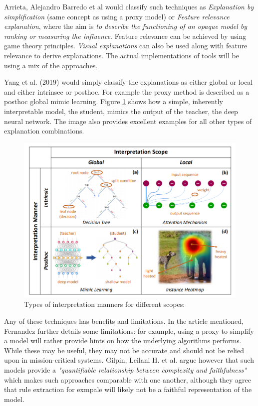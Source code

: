 \documentclass[proposal]{softeng}
\begin{document}
Arrieta, Alejandro Barredo et al \cite{BarredoArrietaAlejandro2020EAIX} would classify such techniques as \textit{Explanation by simplification} (same concept as using a proxy model) or \textit{Feature relevance explanation}, where the aim is \textit{to describe the functioning of an opaque model by ranking or measuring the influence}. Feature relevance can be achieved by using game theory principles. \textit{Visual explanations} can also be used along with feature relevance to derive explanations. The actual implementations of tools will be using a mix of the approaches.

Yang et al. (2019) would simply classify the explanations as either global or local and either intrinsec or posthoc. For example the proxy method is described as a posthoc global mimic learning. Figure \ref{fig:interpretation_scope} shows how a simple, inherently interpretable model, the student, mimics the output of the teacher, the deep neural network. The image also provides excellent examples for all other types of explanation combinations.

\begin{figure}[h!]
\centering
  \includegraphics[width=.8\textwidth]{images/interpretation_scope.png}
  \caption{Types of interpretation manners for different scopes:\cite{YangFan2019EEWG}}
  \label{fig:interpretation_scope}
\end{figure}

Any of these techniques has benefits and limitations. In the article mentioned, Fernandez further details some limitations: for example, using a proxy to simplify a model will rather provide hints on how the underlying algorithms performs. While these may be useful, they may not be accurate and should not be relied upon in mission-critical systems. Gilpin, Leilani H. et al.\cite{GilpinLeilaniH} argue however that such models provide a \textit{"quantifiable relationship between
complexity and faithfulness"} which makes such approaches comparable with one another, although they agree that rule extraction for exmpale will likely not be a faithful representation of the model.
\end{document}
